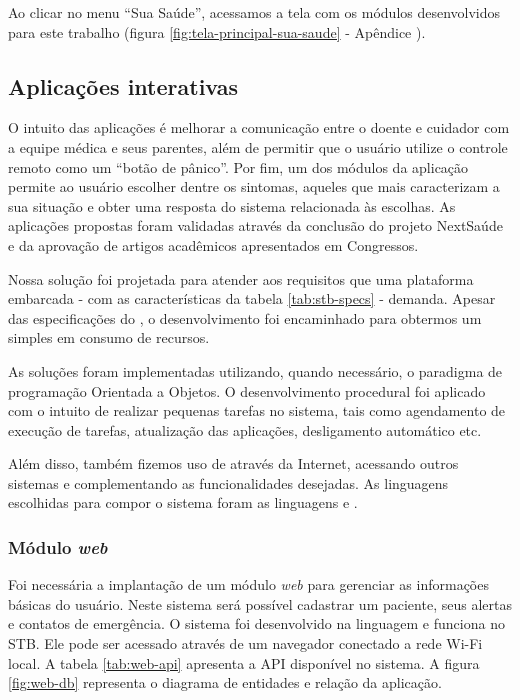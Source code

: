 Ao clicar no menu ``Sua Saúde'', acessamos a tela com os módulos desenvolvidos
para este trabalho (figura \ref{fig:tela-principal-sua-saude} - Apêndice 
).

\subsection{Aplicações interativas} \label{subsec:aplicacoes-tv-health}

O intuito das aplicações é melhorar a comunicação entre o doente e cuidador com
a equipe médica e seus parentes, além de permitir que o usuário utilize o
controle remoto como um ``botão de pânico''. Por fim, um dos módulos da
aplicação permite ao usuário escolher dentre os sintomas, aqueles que mais
caracterizam a sua situação e obter uma resposta do sistema relacionada às
escolhas. As aplicações  propostas foram validadas através da conclusão do
projeto NextSaúde e da aprovação de artigos acadêmicos apresentados em
Congressos.

Nossa solução foi projetada para atender aos requisitos que uma plataforma
embarcada - com as características da tabela \ref{tab:stb-specs} - demanda. Apesar 
das especificações do \hardware[], o desenvolvimento foi encaminhado para 
obtermos um \software[] simples em consumo de recursos.

As soluções foram implementadas utilizando, quando necessário, o paradigma
de programação Orientada a Objetos. O desenvolvimento procedural foi aplicado
com o intuito de realizar pequenas tarefas no sistema, tais como agendamento
de execução de tarefas, atualização das aplicações, desligamento automático etc.

Além disso, também fizemos uso de \webservices[] através da Internet, acessando
outros sistemas e complementando as funcionalidades desejadas. As linguagens
escolhidas para compor o sistema foram as linguagens \python[] e \shell.

\subsubsection{Módulo \textit{web}}

Foi necessária a implantação de um módulo \textit{web} para gerenciar as 
informações básicas do usuário. Neste sistema será possível cadastrar um 
paciente, seus alertas e contatos de emergência. O sistema foi desenvolvido
na linguagem \python[] e funciona no STB. Ele pode ser acessado através de
um navegador conectado a rede Wi-Fi local. A tabela \ref{tab:web-api} apresenta
a API disponível no sistema. A figura \vref{fig:web-db} representa o diagrama
de entidades e relação da aplicação.

